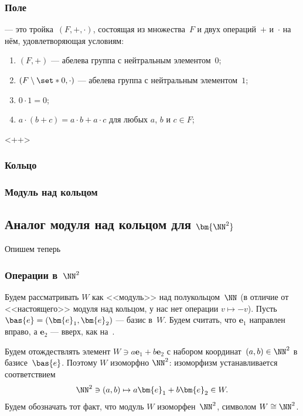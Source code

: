 \subsubsection{Поле}

\begin{definition}
	 --- это тройка~$(F, +, \cdot)$, состоящая из множества~$F$ и двух
	операций~$+$ и~$\cdot$ на нём, удовлетворяющая условиям:
	\begin{enumerate}[1)]
		\item $(F, +)$ --- абелева группа с нейтральным элементом~$0$;
		\item $(F\setminus\set*{0}, \cdot)$ --- абелева группа с нейтральным элементом~$1$;
		\item $0 \cdot 1 = 0$;
		\item $a \cdot (b + c) = a\cdot b + a \cdot c$ для любых $a$, $b$ и $c \in F$;
	\end{enumerate}

	\label{<+label+>}
\end{definition}<++>

\subsubsection{Кольцо}

\subsubsection{Модуль над кольцом}

\subsection[Аналог модуля над кольцом для $\NN^2$]{Аналог модуля над кольцом для $\bm{\NN^2}$}

Опишем теперь

\subsubsection{Операции в~$\NN^2$}

Будем рассматривать $W$ как <<модуль>> над полукольцом~$\NN$ (в отличие от <<настоящего>> модуля над кольцом, у нас нет операции $v \mapsto -v$). Пусть $\bas{e} = (\bm{e}_1, \bm{e}_2)$ --- базис в~$W$. Будем считать, что $\bm{e}_1$ направлен вправо, а $\bm{e}_2$ --- вверх, как на~.

Будем отождествлять элемент $W \ni a\bm{e}_1 + b\bm{e}_2$ с набором координат~$(a, b) \in \NN^2$ в базисе~$\bas{e}$. Поэтому $W$ изоморфно $\NN^2$: изоморфизм устанавливается соответствием
\[
	\NN^2 \ni (a, b) \mapsto a\bm{e}_1 + b \bm{e}_2 \in W
	.
\]
Будем обозначать тот факт, что модуль $W$ изоморфен~$\NN^2$, символом $W \cong \NN^2$.

